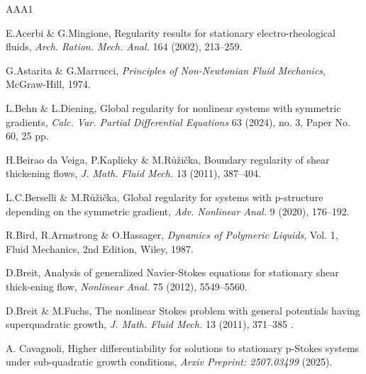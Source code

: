 \documentclass[leqno,11pt]{amsart}%
\numberwithin{equation}{section}
\theoremstyle{definition}
\numberwithin{equation}{section}
\begin{document}
\begin{thebibliography}{AAA1}



  E.Acerbi \& G.Mingione,
  \newblock  Regularity results for stationary electro-rheological fluids,
  \newblock \textit{Arch. Ration. Mech. Anal.} 164 (2002),  213--259.
 

 G.Astarita \& G.Marrucci, \newblock \textit{Principles of Non-Newtonian Fluid Mechanics},  McGraw-Hill, 1974.


  L.Behn \& L.Diening,
  \newblock  Global regularity for nonlinear systems with symmetric gradients,
  \newblock \textit{Calc. Var. Partial Differential Equations} 63 (2024), 
no. 3, Paper No. 60, 25 pp.



  H.Beirao da Veiga, P.Kaplicky \& M.R\r u\v zi\v cka,
  \newblock  Boundary regularity of shear thickening flows,
  \newblock \textit{J. Math.
Fluid Mech.} 13 (2011), 
387--404.



  L.C.Berselli \& M.R\r u\v zi\v cka,
  \newblock  Global regularity for systems with p-structure depending on the symmetric
gradient,
  \newblock \textit{Adv. Nonlinear Anal.} 9 (2020), 
176--192.

 

 R.Bird, R.Armstrong \&  O.Hassager, \newblock \textit{Dynamics of Polymeric Liquids}, Vol. 1, Fluid Mechanics, 2nd Edition, Wiley, 1987.

  D.Breit,
  \newblock Analysis of generalized Navier-Stokes equations for stationary shear thick-ening flow,
  \newblock \textit{Nonlinear Anal.} 
  75 (2012), 5549--5560.
  
  
  

  D.Breit \& M.Fuchs,
  \newblock The nonlinear Stokes problem with general potentials having
superquadratic growth,
  \newblock \textit{J. Math. Fluid Mech.} 13
  (2011), 371--385 .

  A. Cavagnoli,
  \newblock  Higher differentiability for solutions to stationary p-Stokes
systems under sub-quadratic growth conditions,
  \newblock \textit{Arxiv Preprint: 2507.03499}  (2025).


\end{thebibliography}
\end{document}
